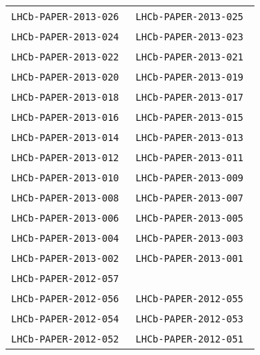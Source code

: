 \begin{center}
\begin{longtable}{ll}
\texttt{LHCb-PAPER-2013-026}~\cite{LHCb-PAPER-2013-026} &
\texttt{LHCb-PAPER-2013-025}~\cite{LHCb-PAPER-2013-025} \\
\texttt{LHCb-PAPER-2013-024}~\cite{LHCb-PAPER-2013-024} &
\texttt{LHCb-PAPER-2013-023}~\cite{LHCb-PAPER-2013-023} \\
\texttt{LHCb-PAPER-2013-022}~\cite{LHCb-PAPER-2013-022} &
\texttt{LHCb-PAPER-2013-021}~\cite{LHCb-PAPER-2013-021} \\
\texttt{LHCb-PAPER-2013-020}~\cite{LHCb-PAPER-2013-020} &
\texttt{LHCb-PAPER-2013-019}~\cite{LHCb-PAPER-2013-019} \\
\texttt{LHCb-PAPER-2013-018}~\cite{LHCb-PAPER-2013-018} &
\texttt{LHCb-PAPER-2013-017}~\cite{LHCb-PAPER-2013-017} \\
\texttt{LHCb-PAPER-2013-016}~\cite{LHCb-PAPER-2013-016} &
\texttt{LHCb-PAPER-2013-015}~\cite{LHCb-PAPER-2013-015} \\
\texttt{LHCb-PAPER-2013-014}~\cite{LHCb-PAPER-2013-014} &
\texttt{LHCb-PAPER-2013-013}~\cite{LHCb-PAPER-2013-013} \\
\texttt{LHCb-PAPER-2013-012}~\cite{LHCb-PAPER-2013-012} &
\texttt{LHCb-PAPER-2013-011}~\cite{LHCb-PAPER-2013-011} \\
\texttt{LHCb-PAPER-2013-010}~\cite{LHCb-PAPER-2013-010} &
\texttt{LHCb-PAPER-2013-009}~\cite{LHCb-PAPER-2013-009} \\
\texttt{LHCb-PAPER-2013-008}~\cite{LHCb-PAPER-2013-008} &
\texttt{LHCb-PAPER-2013-007}~\cite{LHCb-PAPER-2013-007} \\
\texttt{LHCb-PAPER-2013-006}~\cite{LHCb-PAPER-2013-006} &
\texttt{LHCb-PAPER-2013-005}~\cite{LHCb-PAPER-2013-005} \\
\texttt{LHCb-PAPER-2013-004}~\cite{LHCb-PAPER-2013-004} &
\texttt{LHCb-PAPER-2013-003}~\cite{LHCb-PAPER-2013-003} \\
\texttt{LHCb-PAPER-2013-002}~\cite{LHCb-PAPER-2013-002} &
\texttt{LHCb-PAPER-2013-001}~\cite{LHCb-PAPER-2013-001} \\
\hline
\texttt{LHCb-PAPER-2012-057}~\cite{LHCb-PAPER-2012-057} \\
\texttt{LHCb-PAPER-2012-056}~\cite{LHCb-PAPER-2012-056} & 
\texttt{LHCb-PAPER-2012-055}~\cite{LHCb-PAPER-2012-055} \\
\texttt{LHCb-PAPER-2012-054}~\cite{LHCb-PAPER-2012-054} & 
\texttt{LHCb-PAPER-2012-053}~\cite{LHCb-PAPER-2012-053} \\
\texttt{LHCb-PAPER-2012-052}~\cite{LHCb-PAPER-2012-052} & 
\texttt{LHCb-PAPER-2012-051}~\cite{LHCb-PAPER-2012-051} \\

\end{longtable}
\end{center}
